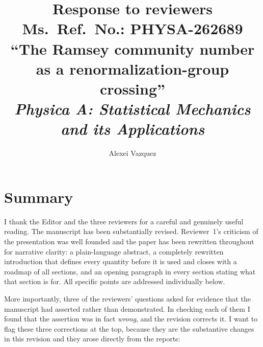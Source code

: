 \documentclass[11pt]{article}
\title{\vspace{-2em}Response to reviewers\\[4pt]
\large Ms.\ Ref.\ No.: PHYSA-262689\\
\large ``The Ramsey community number as a renormalization-group crossing''\\
\large \textit{Physica A: Statistical Mechanics and its Applications}}
\author{Alexei Vazquez}
\date{}
\begin{document}
\maketitle

\section*{Summary}

I thank the Editor and the three reviewers for a careful and genuinely useful
reading. The manuscript has been substantially revised. Reviewer~1's criticism
of the presentation was well founded and the paper has been rewritten
throughout for narrative clarity: a plain-language abstract, a completely
rewritten introduction that defines every quantity before it is used and closes
with a roadmap of all sections, and an opening paragraph in every section
stating what that section is for. All specific points are addressed
individually below.

More importantly, three of the reviewers' questions asked for evidence that the
manuscript had asserted rather than demonstrated. In checking each of them I
found that the assertion was in fact \emph{wrong}, and the revision corrects it.
I want to flag these three corrections at the top, because they are the
substantive changes in this revision and they arose directly from the reports:
\end{document}
